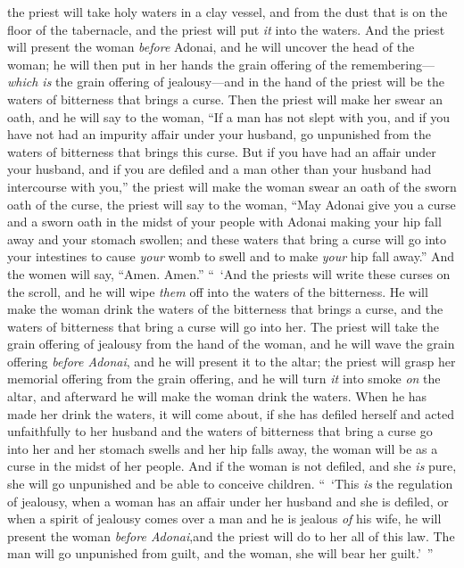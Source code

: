 \begin{biblechapter}
\verse the priest will take holy waters in a clay vessel, and from the dust that is on the floor of the tabernacle, and the priest will put \textit{it} into the waters.
\verse And the priest will present the woman \textit{before} Adonai, and he will uncover the head of the woman; he will then put in her hands the grain offering of the remembering—\textit{which is} the grain offering of jealousy—and in the hand of the priest will be the waters of bitterness that brings a curse.
\verse Then the priest will make her swear an oath, and he will say to the woman, “If a man has not slept with you, and if you have not had an impurity affair under your husband, go unpunished from the waters of bitterness that brings this curse.
\verse But if you have had an affair under your husband, and if you are defiled and a man other than your husband had intercourse with you,”
\verse the priest will make the woman swear an oath of the sworn oath of the curse, the priest will say to the woman, “May Adonai give you a curse and a sworn oath in the midst of your people with Adonai making your hip fall away and your stomach swollen;
\verse and these waters that bring a curse will go into your intestines to cause \textit{your} womb to swell and to make \textit{your} hip fall away.” And the women will say, “Amen. Amen.”
\verse “ ‘And the priests will write these curses on the scroll, and he will wipe \textit{them} off into the waters of the bitterness.
\verse He will make the woman drink the waters of the bitterness that brings a curse, and the waters of bitterness that bring a curse will go into her.
\verse The priest will take the grain offering of jealousy from the hand of the woman, and he will wave the grain offering \textit{before Adonai}, and he will present it to the altar;
\verse the priest will grasp her memorial offering from the grain offering, and he will turn \textit{it} into smoke \textit{on} the altar, and afterward he will make the woman drink the waters.
\verse When he has made her drink the waters, it will come about, if she has defiled herself and acted unfaithfully to her husband and the waters of bitterness that bring a curse go into her and her stomach swells and her hip falls away, the woman will be as a curse in the midst of her people.
\verse And if the woman is not defiled, and she \textit{is} pure, she will go unpunished and be able to conceive children.
\verse “ ‘This \textit{is} the regulation of jealousy, when a woman has an affair under her husband and she is defiled,
\verse or when a spirit of jealousy comes over a man and he is jealous \textit{of} his wife, he will present the woman \textit{before Adonai},and the priest will do to her all of this law.
\verse The man will go unpunished from guilt, and the woman, she will bear her guilt.’ ”
\end{biblechapter}

